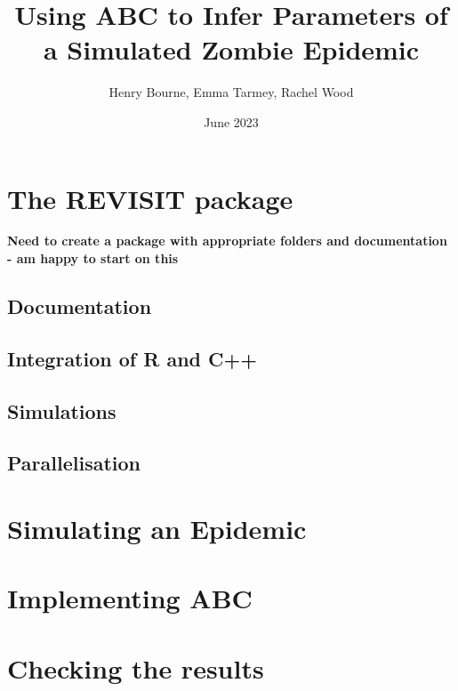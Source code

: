 \documentclass[
]{article}
\title{Using ABC to Infer Parameters of a Simulated Zombie Epidemic}
\author{Henry Bourne, Emma Tarmey, Rachel Wood}
\date{June 2023}
\begin{document}
\maketitle

\hypertarget{the-revisit-package}{%
\section{The REVISIT package}\label{the-revisit-package}}

\textbf{Need to create a package with appropriate folders and documentation - am happy to start on this}

\hypertarget{documentation}{%
\subsection{Documentation}\label{documentation}}

\hypertarget{integration-of-r-and-c}{%
\subsection{Integration of R and C++}\label{integration-of-r-and-c}}

\hypertarget{simulations}{%
\subsection{Simulations}\label{simulations}}

\hypertarget{parallelisation}{%
\subsection{Parallelisation}\label{parallelisation}}

\hypertarget{simulating-an-epidemic}{%
\section{Simulating an Epidemic}\label{simulating-an-epidemic}}

\hypertarget{implementing-abc}{%
\section{Implementing ABC}\label{implementing-abc}}

\hypertarget{checking-the-results}{%
\section{Checking the results}\label{checking-the-results}}
\end{document}
